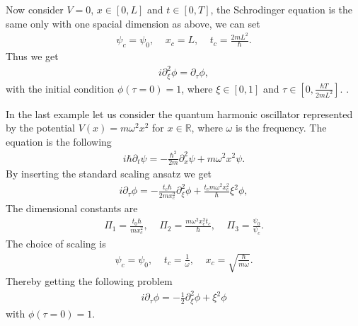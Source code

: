 \documentclass[a4paper]{article}
\begin{document}
Now consider $V = 0$, $x\in[0, L]$ and $t \in [0, T]$, the Schrodinger
equation is the same only with one spacial dimension as above, we can set
\begin{align}
    \psi_c = \psi_0, \;\;\;\; x_c =L, \;\;\;\; t_c = \frac{2mL^2}{\hbar}.
\end{align}
Thus we get
\begin{align}
    i\partial_{\xi}^2 \phi = \partial_\tau \phi,
\end{align}
with the initial condition $\phi(\tau=0) = 1$, where $\xi \in [0, 1]$ and
$\tau \in [0, \frac{\hbar T}{2mL^2}]$.
.

In the last example let us consider the quantum harmonic oscillator
represented by the potential $V(x) = m\omega^2 x^2$ for $x\in \mathbb{R}$,
where $\omega$ is the frequency. The equation is the following
\begin{align}
    i \hbar \partial_t \psi = -\frac{\hbar^2}{2m}\partial^2_x \psi
    +m\omega^2x^2 \psi.
\end{align}
By inserting the standard scaling ansatz we get
\begin{align}
    i\partial_\tau \phi = -\frac{t_c\hbar}{2mx_c^2}\partial_\xi^2 \phi
    +\frac{t_cm\omega^2x_c^2}{\hbar} \xi^2 \phi,
\end{align}
The dimensional constants are
\begin{align}
    \Pi_1 = \frac{t_0\hbar}{mx_c^2},\;\;\;\;\Pi_2 =
    \frac{m\omega^2x_c^2t_c}{\hbar},\;\;\;\; \Pi_3 = \frac{\psi_0}{\psi_c}.
\end{align}
The choice of scaling is
\begin{align}
    \psi_c = \psi_0, \;\;\;\; t_c = \frac{1}{\omega}, \;\;\;\; x_c =
    \sqrt{\frac{\hbar}{m\omega}}.
\end{align}
Thereby getting the following problem
\begin{align}
    i\partial_\tau \phi = -\frac{1}{2} \partial_\xi^2 \phi +\xi^2 \phi
\end{align}
with $\phi(\tau = 0) = 1$.

\end{document}
